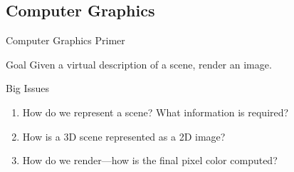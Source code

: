 \documentclass[10pt]{beamer}
\begin{document}
\subsection{Computer Graphics}
\begin{frame}{Computer Graphics Primer}
  \begin{block}{Goal}
    Given a virtual description of a scene, render an image.
  \end{block}

  \begin{block}{Big Issues}
    \begin{enumerate}
      \item How do we represent a scene? What information is required?  %
      \item How is a 3D scene represented as a 2D image?  %
      \item How do we render---how is the final pixel color computed? %
    \end{enumerate}
  \end{block}
\end{frame}
\end{document}
